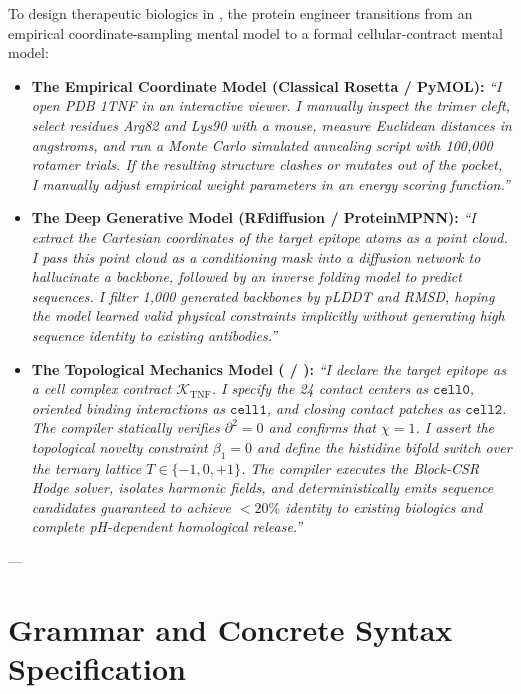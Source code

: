 To design therapeutic biologics in \ToposLang{}, the protein engineer transitions from an empirical coordinate-sampling mental model to a formal cellular-contract mental model:

\begin{itemize}[leftmargin=1.2cm]
    \item \textbf{The Empirical Coordinate Model (Classical Rosetta / PyMOL):}  
    \textit{``I open PDB 1TNF in an interactive viewer. I manually inspect the trimer cleft, select residues Arg82 and Lys90 with a mouse, measure Euclidean distances in angstroms, and run a Monte Carlo simulated annealing script with 100,000 rotamer trials. If the resulting structure clashes or mutates out of the pocket, I manually adjust empirical weight parameters in an energy scoring function.''}
    
    \item \textbf{The Deep Generative Model (RFdiffusion / ProteinMPNN):}  
    \textit{``I extract the Cartesian coordinates of the target epitope atoms as a point cloud. I pass this point cloud as a conditioning mask into a diffusion network to hallucinate a backbone, followed by an inverse folding model to predict sequences. I filter 1,000 generated backbones by pLDDT and RMSD, hoping the model learned valid physical constraints implicitly without generating high sequence identity to existing antibodies.''}

    \item \textbf{The Topological Mechanics Model (\ToposLang{} / \PLQ{}):}  
    \textit{``I declare the target epitope as a cell complex contract $\mathcal{K}_{\text{TNF}}$. I specify the 24 contact centers as $\texttt{cell0}$, oriented binding interactions as $\texttt{cell1}$, and closing contact patches as $\texttt{cell2}$. The compiler statically verifies $\partial^2 = 0$ and confirms that $\chi = 1$. I assert the topological novelty constraint $\beta_1 = 0$ and define the histidine bifold switch over the ternary lattice $T \in \{-1, 0, +1\}$. The compiler executes the Block-CSR Hodge solver, isolates harmonic fields, and deterministically emits sequence candidates guaranteed to achieve $<20\%$ identity to existing biologics and complete pH-dependent homological release.''}
\end{itemize}

---

\section{Grammar and Concrete Syntax Specification}
\label{sec:grammar_syntax}

